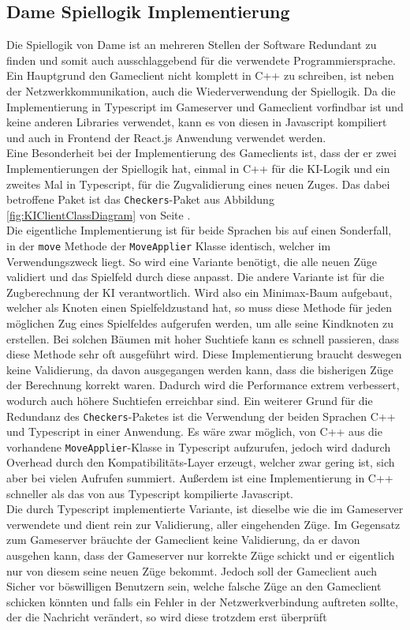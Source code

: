 \documentclass[12pt,a4paper,bibliography=totocnumbered,listof=totocnumbered]{article}
\begin{document}
\subsection{Dame Spiellogik Implementierung}
Die Spiellogik von Dame ist an mehreren Stellen der Software Redundant zu finden und somit auch ausschlaggebend für die verwendete Programmiersprache.
Ein Hauptgrund den Gameclient nicht komplett in C++ zu schreiben, ist neben der Netzwerkkommunikation, auch die Wiederverwendung der Spiellogik.
Da die Implementierung in Typescript im Gameserver und Gameclient vorfindbar ist und keine anderen Libraries verwendet, kann es von diesen in Javascript kompiliert 
und auch in Frontend der React.js Anwendung verwendet werden.
\\
Eine Besonderheit bei der Implementierung des Gameclients ist, dass der er zwei Implementierungen der Spiellogik hat, 
einmal in C++ für die KI-Logik und ein zweites Mal in Typescript, für die Zugvalidierung eines neuen Zuges. 
Das dabei betroffene Paket ist das \texttt{Checkers}-Paket aus Abbildung \ref{fig:KIClientClassDiagram} von Seite \pageref{fig:KIClientClassDiagram}. 
\\
Die eigentliche Implementierung ist für beide Sprachen bis auf einen Sonderfall, in der \texttt{move} Methode der \texttt{MoveApplier} Klasse identisch, 
welcher im Verwendungszweck liegt. So wird eine Variante benötigt, die alle neuen Züge validiert und das Spielfeld durch diese anpasst. Die andere Variante ist für 
die Zugberechnung der KI verantwortlich. Wird also ein Minimax-Baum aufgebaut, welcher als Knoten einen Spielfeldzustand hat, so muss diese Methode für jeden möglichen Zug eines 
Spielfeldes aufgerufen werden, um alle seine Kindknoten zu erstellen. Bei solchen Bäumen mit hoher Suchtiefe kann es schnell passieren, 
dass diese Methode sehr oft ausgeführt wird. Diese Implementierung braucht deswegen keine Validierung, da davon ausgegangen werden kann, dass die bisherigen Züge der 
Berechnung korrekt waren. Dadurch wird die Performance extrem verbessert, wodurch auch höhere Suchtiefen erreichbar sind.
Ein weiterer Grund für die Redundanz des \texttt{Checkers}-Paketes ist die Verwendung der beiden Sprachen C++ und Typescript in einer Anwendung. 
Es wäre zwar möglich, von C++ aus die vorhandene \texttt{MoveApplier}-Klasse in Typescript aufzurufen, jedoch wird dadurch Overhead durch den Kompatibilitäts-Layer erzeugt,
welcher zwar gering ist, sich aber bei vielen Aufrufen summiert. Außerdem ist eine Implementierung in C++ schneller als das von aus Typescript kompilierte Javascript.
\\
Die durch Typescript implementierte Variante, ist dieselbe wie die im Gameserver verwendete und dient rein zur Validierung, aller eingehenden Züge. Im Gegensatz zum Gameserver 
bräuchte der Gameclient keine Validierung, da er davon ausgehen kann, dass der Gameserver nur korrekte Züge schickt und er eigentlich nur von diesem seine 
neuen Züge bekommt. Jedoch soll der Gameclient auch Sicher vor böswilligen Benutzern sein, welche falsche Züge an den Gameclient schicken könnten und falls ein Fehler 
in der Netzwerkverbindung auftreten sollte, der die Nachricht verändert, so wird diese trotzdem erst überprüft
\end{document}
